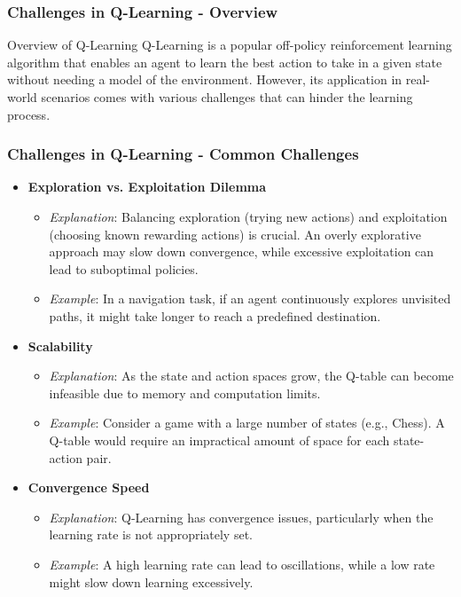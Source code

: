 \documentclass[aspectratio=169]{beamer}
\begin{document}
\begin{frame}[fragile]
    \frametitle{Challenges in Q-Learning - Overview}
    \begin{block}{Overview of Q-Learning}
        Q-Learning is a popular off-policy reinforcement learning algorithm that enables an agent to learn the best action to take in a given state without needing a model of the environment. However, its application in real-world scenarios comes with various challenges that can hinder the learning process.
    \end{block}
\end{frame}

\begin{frame}[fragile]
    \frametitle{Challenges in Q-Learning - Common Challenges}
    \begin{itemize}
        \item \textbf{Exploration vs. Exploitation Dilemma}
            \begin{itemize}
                \item \textit{Explanation}: Balancing exploration (trying new actions) and exploitation (choosing known rewarding actions) is crucial. An overly explorative approach may slow down convergence, while excessive exploitation can lead to suboptimal policies.
                \item \textit{Example}: In a navigation task, if an agent continuously explores unvisited paths, it might take longer to reach a predefined destination.
            \end{itemize}
        
        \item \textbf{Scalability}
            \begin{itemize}
                \item \textit{Explanation}: As the state and action spaces grow, the Q-table can become infeasible due to memory and computation limits.
                \item \textit{Example}: Consider a game with a large number of states (e.g., Chess). A Q-table would require an impractical amount of space for each state-action pair.
            \end{itemize}
        
        \item \textbf{Convergence Speed}
            \begin{itemize}
                \item \textit{Explanation}: Q-Learning has convergence issues, particularly when the learning rate is not appropriately set.
                \item \textit{Example}: A high learning rate can lead to oscillations, while a low rate might slow down learning excessively.
            \end{itemize}
    \end{itemize}
\end{frame}
\end{document}
